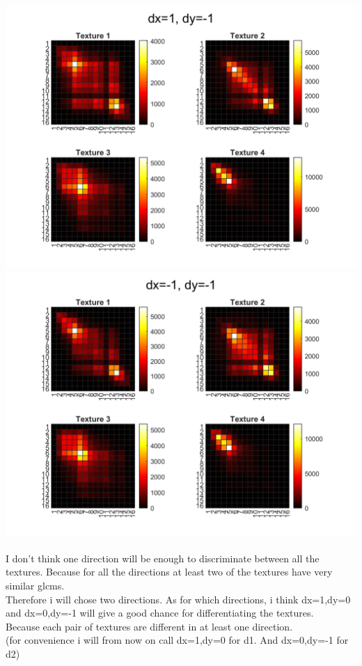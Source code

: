 \documentclass[12pt, letterpaper, twoside]{article}
\begin{document}
\includegraphics[scale=0.4]{"task1_d3"}\\
\includegraphics[scale=0.4]{"task1_d4"}\\
\ \\
I don't think one direction will be enough to discriminate between all the textures. Because for all the directions at least two of the textures have very similar glcms.\\
Therefore i will chose two directions. As for which directions, i think dx=1,dy=0 and dx=0,dy=-1 will give a good chance for differentiating the textures.\\
Because each pair of textures are different in at least one direction.\\
(for convenience i will from now on call dx=1,dy=0 for d1. And dx=0,dy=-1 for d2)\\
\end{document}
